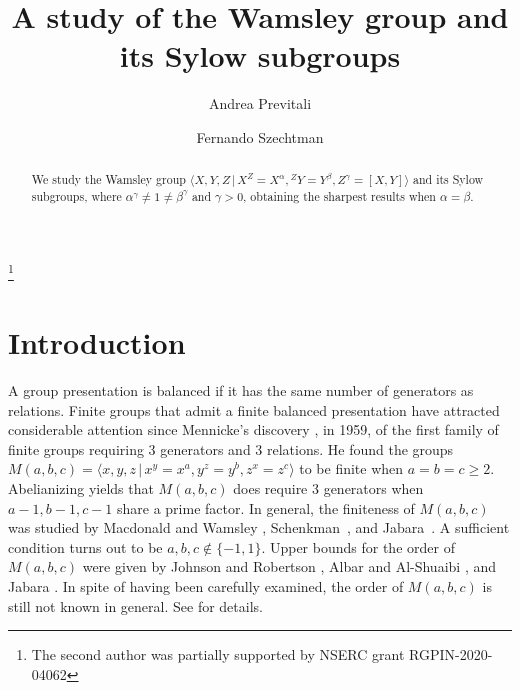 \documentclass{amsart}
\theoremstyle{definition}
\theoremstyle{remark}
\begin{document}
\title[A study of the Wamsley group and its Sylow subgroups]{A study of the Wamsley group and its Sylow subgroups}


\author{Andrea Previtali}
\address{Dipartimento di Matematica e Applicazioni, University of Milano-Bicocca, Milano, Italy}


\author{Fernando Szechtman}
\address{Department of Mathematics and Statistics, University of Regina, Canada}
\thanks{The second author was partially supported by NSERC grant RGPIN-2020-04062}






\begin{abstract} We study the Wamsley group $\langle X,Y,Z\,|\, X^Z=X^\alpha, {}^Z Y=Y^\beta, Z^\gamma=[X,Y]\rangle$
and its Sylow subgroups, where $\alpha^\gamma\neq 1\neq \beta^\gamma$ and $\gamma>0$, obtaining the sharpest
results when $\alpha=\beta$.
\end{abstract}

\maketitle

\section{Introduction}\label{sec1}

A group presentation is balanced if it has the same number of generators as relations.
Finite groups that admit a finite balanced presentation have attracted considerable attention 
since Mennicke's discovery \cite{Me}, in 1959, of the first family of finite groups requiring 3 generators and 3 relations.
He found the groups $M(a,b,c)=\langle x,y,z\,|\, x^y=x^a, y^{z}=y^b, z^x=z^c\rangle$ 
to be finite when $a=b=c\geq 2$. Abelianizing yields that
$M(a,b,c)$ does require 3 generators when $a-1,b-1,c-1$ share a prime factor. 
In general, the finiteness of $M(a,b,c)$ was studied by Macdonald and Wamsley \cite{W}, Schenkman~\cite{S}, and Jabara~\cite{Ja}. 
A sufficient condition turns out to be $a,b,c\notin\{-1,1\}$. Upper bounds for the order of 
$M(a,b,c)$ were given by Johnson and Robertson \cite{JR}, Albar and Al-Shuaibi \cite{AA}, and Jabara \cite{Ja}.
In spite of having been carefully examined, the order of $M(a,b,c)$ is still not known in general. See \cite{Me,A,AA,Ja}
for details.
\end{document}
